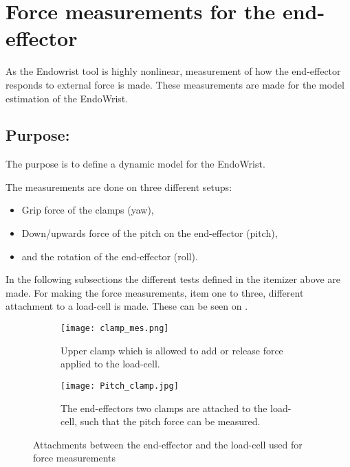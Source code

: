 \section{Force measurements for the end-effector} %

As the Endowrist tool is highly nonlinear, measurement of how the end-effector responds to external force is made. These measurements are made for the model estimation of the EndoWrist.  

\subsection*{Purpose:}
The purpose is to define a dynamic model for the EndoWrist.

The measurements are done on three different setups:
\begin{itemize}
\item Grip force of the clamps (yaw),
\item Down/upwards force of the pitch on the end-effector (pitch),
\item and the rotation of the end-effector (roll).
\end{itemize}

In the following subsections the different tests defined in the itemizer above are made. For making the force measurements, item one to three, different attachment to a load-cell is made. These can be seen on .
\begin{figure}[H]
	\centering
	\begin{subfigure}{.48\textwidth}
		\centering
		\vspace{-12pt}
		\texttt{[image: clamp\_mes.png]}
		\caption{Upper clamp which is allowed to add or release force applied to the load-cell.}
		\label{fig:one_clamp}
	\end{subfigure}
	\begin{subfigure}{.48\textwidth}
		\centering
		\texttt{[image: Pitch\_clamp.jpg]}
		\caption{The end-effectors two clamps are attached to the load-cell, such that the pitch force can be measured.}
		\label{fig:pitch_force}
	\end{subfigure}
\caption{Attachments between the end-effector and the load-cell used for force measurements}
\label{fig:Overview_endowrist_attachment}
\end{figure}

